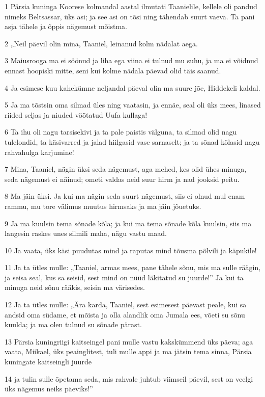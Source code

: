 \par 1 Pärsia kuninga Koorese kolmandal aastal ilmutati Taanielile, kellele oli pandud nimeks Beltsassar, üks asi; ja see asi on tõsi ning tähendab suurt vaeva. Ta pani asja tähele ja õppis nägemust mõistma.
\par 2 „Neil päevil olin mina, Taaniel, leinanud kolm nädalat aega.
\par 3 Maiusrooga ma ei söönud ja liha ega viina ei tulnud mu suhu, ja ma ei võidnud ennast hoopiski mitte, seni kui kolme nädala päevad olid täis saanud.
\par 4 Ja esimese kuu kahekümne neljandal päeval olin ma suure jõe, Hiddekeli kaldal.
\par 5 Ja ma tõstsin oma silmad üles ning vaatasin, ja ennäe, seal oli üks mees, linased riided seljas ja niuded vöötatud Uufa kullaga!
\par 6 Ta ihu oli nagu tarsisekivi ja ta pale paistis välguna, ta silmad olid nagu tulelondid, ta käsivarred ja jalad hiilgasid vase sarnaselt; ja ta sõnad kõlasid nagu rahvahulga karjumine!
\par 7 Mina, Taaniel, nägin üksi seda nägemust, aga mehed, kes olid ühes minuga, seda nägemust ei näinud; ometi valdas neid suur hirm ja nad jooksid peitu.
\par 8 Ma jäin üksi. Ja kui ma nägin seda suurt nägemust, siis ei olnud mul enam rammu, mu tore välimus muutus hirmsaks ja ma jäin jõuetuks.
\par 9 Ja ma kuulsin tema sõnade kõla; ja kui ma tema sõnade kõla kuulsin, siis ma langesin raskes unes silmili maha, nägu vastu maad.
\par 10 Ja vaata, üks käsi puudutas mind ja raputas mind tõusma põlvili ja käpukile!
\par 11 Ja ta ütles mulle: „Taaniel, armas mees, pane tähele sõnu, mis ma sulle räägin, ja seisa seal, kus sa seisid, sest mind on nüüd läkitatud su juurde!” Ja kui ta minuga neid sõnu rääkis, seisin ma värisedes.
\par 12 Ja ta ütles mulle: „Ära karda, Taaniel, sest esimesest päevast peale, kui sa andsid oma südame, et mõista ja olla alandlik oma Jumala ees, võeti su sõnu kuulda; ja ma olen tulnud su sõnade pärast.
\par 13 Pärsia kuningriigi kaitseingel pani mulle vastu kakskümmend üks päeva; aga vaata, Miikael, üks peainglitest, tuli mulle appi ja ma jätsin tema sinna, Pärsia kuningate kaitseingli juurde
\par 14 ja tulin sulle õpetama seda, mis rahvale juhtub viimseil päevil, sest on veelgi üks nägemus neiks päeviks!”

